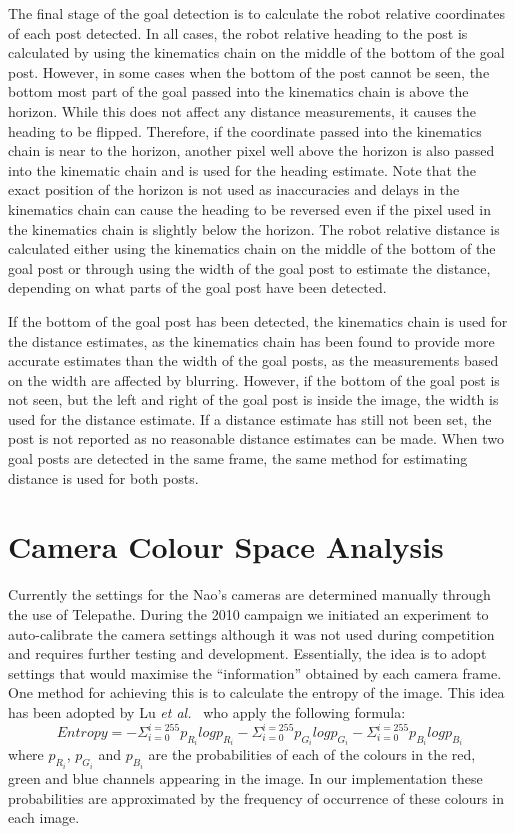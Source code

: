 \documentclass[pdftex,11pt,a4paper]{report}
\begin{document}
The final stage of the goal detection is to calculate the robot relative coordinates of each post detected. In all cases, the robot relative heading to the post is calculated by using the kinematics chain on the middle of the bottom of the goal post. However, in some cases when the bottom of the post cannot be seen, the bottom most part of the goal passed into the kinematics chain is above the horizon. While this does not affect any distance measurements, it causes the heading to be flipped. Therefore, if the coordinate passed into the kinematics chain is near to the horizon, another pixel well above the horizon is also passed into the kinematic chain and is used for the heading estimate. Note that the exact position of the horizon is not used as inaccuracies and delays in the kinematics chain can cause the heading to be reversed even if the pixel used in the kinematics chain is slightly below the horizon. The robot relative distance is calculated either using the kinematics chain on the middle of the bottom of the goal post or through using the width of the goal post to estimate the distance, depending on what parts of the goal post have been detected. 

If the bottom of the goal post has been detected, the kinematics chain is used for the distance estimates, as the kinematics chain has been found to provide more accurate estimates than the width of the goal posts, as the measurements based on the width are affected by blurring. However, if the bottom of the goal post is not seen, but the left and right of the goal post is inside the image, the width is used for the distance estimate. If a distance estimate has still not been set, the post is not reported as no reasonable distance estimates can be made. When two goal posts are detected in the same frame, the same method for estimating distance is used for both posts.

\section{Camera Colour Space Analysis}
\label{sectionCameraCalibration}

Currently the settings for the Nao's cameras are determined manually through the
use of Telepathe.
During the 2010 campaign we initiated an experiment to auto-calibrate the
camera settings although it was not used during competition and requires further
testing and development.
Essentially, the idea is to adopt settings that would maximise the ``information''
obtained by each camera frame.
One method for achieving this is to calculate the entropy of the image.
This idea has been adopted by  Lu \textit{et al.}~\cite{Lu09} who apply
the following formula:
\begin{equation}
Entropy = - \Sigma_{i = 0}^{i = 255} p_{R_i} log p_{R_i}
          - \Sigma_{i = 0}^{i = 255} p_{G_i} log p_{G_i}
          - \Sigma_{i = 0}^{i = 255} p_{B_i} log p_{B_i}
\end{equation}
where $p_{R_i}$, $p_{G_i}$ and $p_{B_i}$ are the probabilities of each
of the colours in the red, green and blue channels appearing in the image.
In our implementation these probabilities are approximated by the frequency
of occurrence of these colours in each image.
\end{document}
